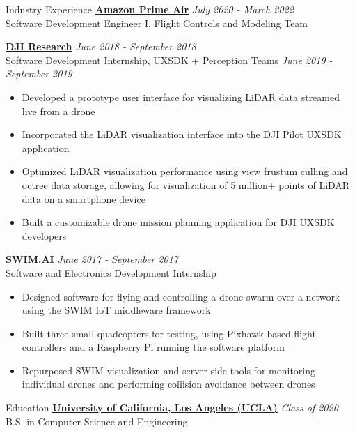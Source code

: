 \documentclass{comran_morshed_resume}
\begin{document}

\begin{rSection}{Industry Experience}
    {\bf\href{https://www.amazon.com/Amazon-Prime-Air/b?ie=UTF8&node=8037720011}{Amazon Prime Air}} \hfill {\textit{July 2020 - March 2022}} \\
    Software Development Engineer I, Flight Controls and Modeling Team

    {\bf\href{https://www.dji.com/}{DJI Research}} \hfill {\textit{June 2018 - September 2018}} \\
    Software Development Internship, UXSDK + Perception Teams \hfill {\textit{June 2019 - September 2019}}

    \begin{itemize}
        \item Developed a prototype user interface for visualizing LiDAR data streamed live from a drone
        \item Incorporated the LiDAR visualization interface into the DJI Pilot UXSDK application
        \item Optimized LiDAR visualization performance using view frustum culling and octree data storage, allowing for visualization of 5 million+ points of LiDAR data on a smartphone device
        \item Built a customizable drone mission planning application for DJI UXSDK developers
\end{itemize}
    

    {\bf\href{https://www.swim.ai/}{SWIM.AI}} \hfill {\textit{June 2017 - September 2017}} \\
    Software and Electronics Development Internship
    \begin{itemize}
        \item Designed software for flying and controlling a drone swarm over a network using the SWIM IoT middleware framework
        \item Built three small quadcopters for testing, using Pixhawk-based flight controllers and a Raspberry Pi running the software platform
        \item Repurposed SWIM visualization and server-side tools for monitoring individual drones and performing collision avoidance between drones
    \end{itemize}
\end{rSection}

\begin{rSection}{Education}
    {\bf\href{https://ucla.edu}{University of California, Los Angeles (UCLA)}} \hfill {\textit{Class of 2020}} \\
    B.S. in Computer Science and Engineering
\end{rSection}
\end{document}
